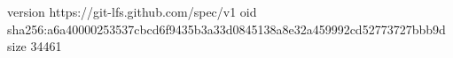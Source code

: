 version https://git-lfs.github.com/spec/v1
oid sha256:a6a40000253537cbcd6f9435b3a33d0845138a8e32a459992cd52773727bbb9d
size 34461
